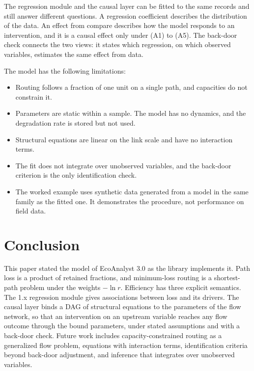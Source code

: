 \documentclass[12pt]{article}
\newcommand{\code}[1]{{\ttfamily\def\_{\textunderscore\allowbreak}#1}}
\theoremstyle{plain}
\theoremstyle{definition}
\begin{document}
The regression module and the causal layer can be fitted to the same records and still answer different questions. A regression coefficient describes the distribution of the data. An effect from \code{compare} describes how the model responds to an intervention, and it is a causal effect only under (A1) to (A5). The back-door check connects the two views: it states which regression, on which observed variables, estimates the same effect from data.

The model has the following limitations:
\begin{itemize}
    \item Routing follows a fraction of one unit on a single path, and capacities do not constrain it.
    \item Parameters are static within a sample. The model has no dynamics, and the degradation rate is stored but not used.
    \item Structural equations are linear on the link scale and have no interaction terms.
    \item The fit does not integrate over unobserved variables, and the back-door criterion is the only identification check.
    \item The worked example uses synthetic data generated from a model in the same family as the fitted one. It demonstrates the procedure, not performance on field data.
\end{itemize}

\section{Conclusion}\label{sec:conclusion}

This paper stated the model of EcoAnalyst 3.0 as the library implements it. Path loss is a product of retained fractions, and minimum-loss routing is a shortest-path problem under the weights $-\ln r$. Efficiency has three explicit semantics. The 1.x regression module gives associations between loss and its drivers. The causal layer binds a DAG of structural equations to the parameters of the flow network, so that an intervention on an upstream variable reaches any flow outcome through the bound parameters, under stated assumptions and with a back-door check. Future work includes capacity-constrained routing as a generalized flow problem, equations with interaction terms, identification criteria beyond back-door adjustment, and inference that integrates over unobserved variables.



\end{document}
